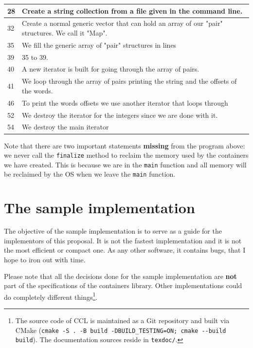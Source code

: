 \documentclass[12pt,a4paper,openany]{memoir} %
\begin{document}
{{{\begin{longtable}{|p{1.0cm}|p{13.5cm}|}
28& Create a string collection from a file given in the
   command line.\\\hline
32& Create a normal generic vector that can hold an array
   of our "pair" structures. We call it "Map".\\\hline
35& We fill the generic array of "pair" structures in lines\\
39& 35 to 39.\\\hline
40& A new iterator is built for going through the array of
   pairs.\\\hline
41& We loop through the array of pairs printing the string and
   the offsets of the words.\\\hline
46& To print the words offsets we use another iterator that
   loops through\\\hline
52& We destroy the iterator for the integers since we are done
   with it.\\\hline
54& We destroy the main iterator \\\hline
\end{longtable}
}

Note that there are two important statements \textbf{missing} from the program above: we never call the \texttt{finalize} method to reclaim the memory used by the containers we have created. This is because we are in the \texttt{main} function and all memory will be reclaimed by the OS when we leave the \texttt{main} function.
\chapter{The sample implementation}
The objective of the sample implementation is to serve as a guide for the implementors of this proposal. It is not the fastest implementation and it is not the most efficient or compact one. As any other software, it contains bugs, that I hope to iron out with time.

Please note that all the decisions done for the sample implementation are \textbf{not} part of the specifications of the containers library. Other
implementations could do completely different things\footnote{The source code of CCL is maintained as a Git repository and built via CMake (\texttt{cmake -S . -B build -DBUILD\_TESTING=ON; cmake -{}-build build}). The documentation sources reside in \texttt{texdoc/}.}.
}}
\end{document}
